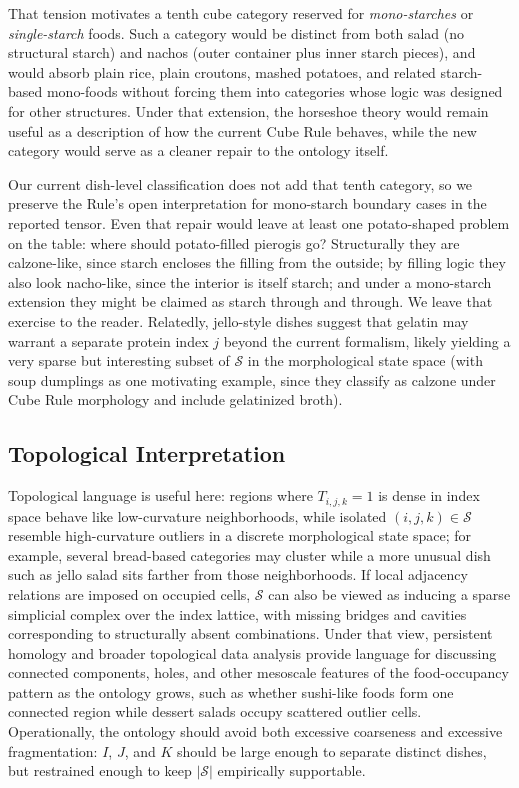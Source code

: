 That tension motivates a tenth cube category reserved for \emph{mono-starches} or \emph{single-starch} foods. Such a category would be distinct from both salad (no structural starch) and nachos (outer container plus inner starch pieces), and would absorb plain rice, plain croutons, mashed potatoes, and related starch-based mono-foods without forcing them into categories whose logic was designed for other structures. Under that extension, the horseshoe theory would remain useful as a description of how the current Cube Rule behaves, while the new category would serve as a cleaner repair to the ontology itself.

Our current dish-level classification does not add that tenth category, so we preserve the Rule's open interpretation for mono-starch boundary cases in the reported tensor.
Even that repair would leave at least one potato-shaped problem on the table: where should potato-filled pierogis go? Structurally they are calzone-like, since starch encloses the filling from the outside; by filling logic they also look nacho-like, since the interior is itself starch; and under a mono-starch extension they might be claimed as starch through and through. We leave that exercise to the reader.
Relatedly, jello-style dishes suggest that gelatin may warrant a separate protein index $j$ beyond the current formalism, likely yielding a very sparse but interesting subset of $\mathcal{S}$ in the morphological state space (with soup dumplings as one motivating example, since they classify as calzone under Cube Rule morphology and include gelatinized broth).

\subsection{Topological Interpretation}

Topological language is useful here: regions where $T_{i,j,k}=1$ is dense in index space behave like low-curvature neighborhoods, while isolated $(i,j,k) \in \mathcal{S}$ resemble high-curvature outliers in a discrete morphological state space; for example, several bread-based categories may cluster while a more unusual dish such as jello salad sits farther from those neighborhoods.
If local adjacency relations are imposed on occupied cells, $\mathcal{S}$ can also be viewed as inducing a sparse simplicial complex over the index lattice, with missing bridges and cavities corresponding to structurally absent combinations.
Under that view, persistent homology and broader topological data analysis provide language for discussing connected components, holes, and other mesoscale features of the food-occupancy pattern as the ontology grows, such as whether sushi-like foods form one connected region while dessert salads occupy scattered outlier cells.
Operationally, the ontology should avoid both excessive coarseness and excessive fragmentation: $I$, $J$, and $K$ should be large enough to separate distinct dishes, but restrained enough to keep $|\mathcal{S}|$ empirically supportable.

